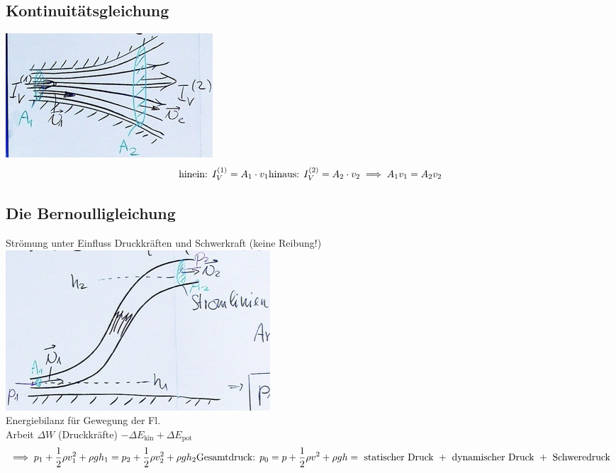 \subsection{Kontinuitätsgleichung}
\includegraphics{Bild81}
\[
	\text{hinein: } I_V^{(1)} = A_1 \cdot v_1 \\
	\text{hinaus: } I_V^{(2)} = A_2 \cdot v_2 \\
	\implies A_1 v_1 = A_2 v_2
\]

\subsection{Die Bernoulligleichung}
Strömung unter Einfluss Druckkräften und Schwerkraft (keine Reibung!) \\
\includegraphics{Bild82} \\
Energiebilanz für Gewegung der Fl. \\
Arbeit $\Delta W$ (Druckkräfte) $- \Delta E_{\text{kin}} + \Delta E_{\text{pot}}$
\[
	\implies p_1 + \frac{1}{2} \rho v_1^2 + \rho g h_1 = p_2 + \frac{1}{2} \rho v_2^2 + \rho g h_2 \\
	\text{Gesamtdruck: } p_0 = p + \frac{1}{2} \rho v^2 + \rho g h  = \text{ statischer Druck } + \text{ dynamischer Druck } + \text{ Schweredruck}
\]

